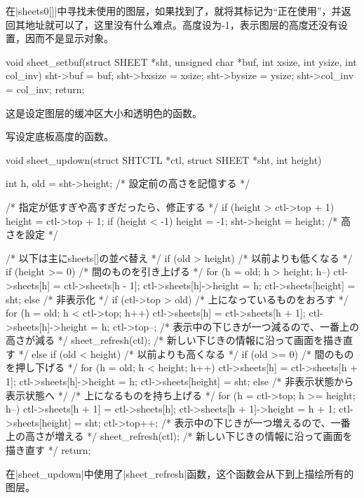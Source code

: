 在|sheets0[]|中寻找未使用的图层，如果找到了，就将其标记为“正在使用”，并返回其地址就可以了，这里没有什么难点。高度设为-1，表示图层的高度还没有设置，因而不是显示对象。

\cs

\begin{code}
void sheet_setbuf(struct SHEET *sht, unsigned char *buf, int xsize, int ysize, int col_inv)
{
	sht->buf = buf;
	sht->bxsize = xsize;
	sht->bysize = ysize;
	sht->col_inv = col_inv;
	return;
}
\end{code}

这是设定图层的缓冲区大小和透明色的函数。

\cs

写设定底板高度的函数。
\begin{code}
void sheet_updown(struct SHTCTL *ctl, struct SHEET *sht, int height)
{
	int h, old = sht->height; /* 設定前の高さを記憶する */

	/* 指定が低すぎや高すぎだったら、修正する */
	if (height > ctl->top + 1) {
		height = ctl->top + 1;
	}
	if (height < -1) {
		height = -1;
	}
	sht->height = height; /* 高さを設定 */

	/* 以下は主にsheets[]の並べ替え */
	if (old > height) {	/* 以前よりも低くなる */
		if (height >= 0) {
			/* 間のものを引き上げる */
			for (h = old; h > height; h--) {
				ctl->sheets[h] = ctl->sheets[h - 1];
				ctl->sheets[h]->height = h;
			}
			ctl->sheets[height] = sht;
		} else {	/* 非表示化 */
			if (ctl->top > old) {
				/* 上になっているものをおろす */
				for (h = old; h < ctl->top; h++) {
					ctl->sheets[h] = ctl->sheets[h + 1];
					ctl->sheets[h]->height = h;
				}
			}
			ctl->top--; /* 表示中の下じきが一つ減るので、一番上の高さが減る */
		}
		sheet_refresh(ctl); /* 新しい下じきの情報に沿って画面を描き直す */
	} else if (old < height) {	/* 以前よりも高くなる */
		if (old >= 0) {
			/* 間のものを押し下げる */
			for (h = old; h < height; h++) {
				ctl->sheets[h] = ctl->sheets[h + 1];
				ctl->sheets[h]->height = h;
			}
			ctl->sheets[height] = sht;
		} else {	/* 非表示状態から表示状態へ */
			/* 上になるものを持ち上げる */
			for (h = ctl->top; h >= height; h--) {
				ctl->sheets[h + 1] = ctl->sheets[h];
				ctl->sheets[h + 1]->height = h + 1;
			}
			ctl->sheets[height] = sht;
			ctl->top++; /* 表示中の下じきが一つ増えるので、一番上の高さが増える */
		}
		sheet_refresh(ctl); /* 新しい下じきの情報に沿って画面を描き直す */
	}
	return;
}
\end{code}

\cs

在|sheet_updown|中使用了|sheet_refresh|函数，这个函数会从下到上描绘所有的图层。

